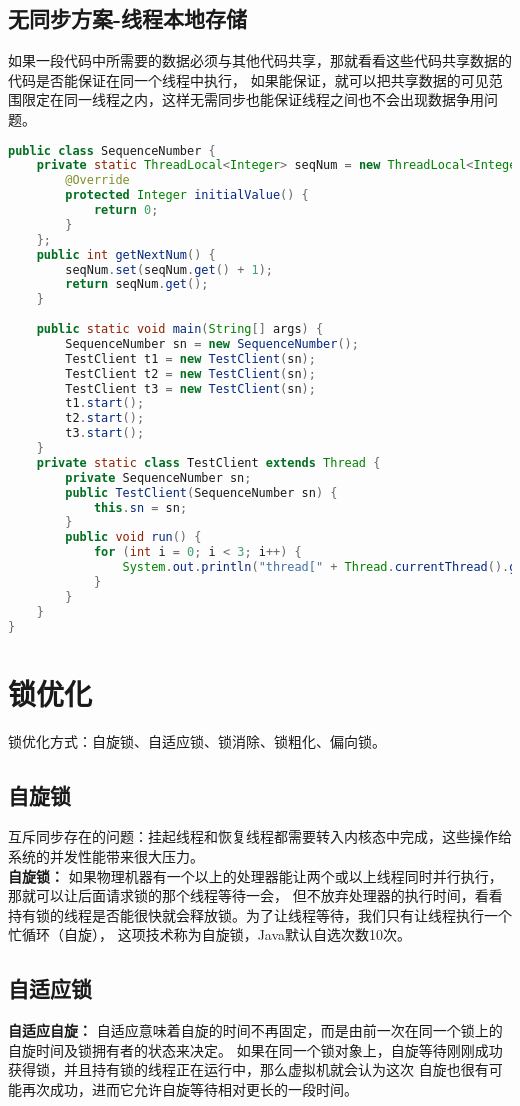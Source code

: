 \subsection{无同步方案-线程本地存储}
如果一段代码中所需要的数据必须与其他代码共享，那就看看这些代码共享数据的代码是否能保证在同一个线程中执行，
如果能保证，就可以把共享数据的可见范围限定在同一线程之内，这样无需同步也能保证线程之间也不会出现数据争用问题。
\begin{lstlisting}[language=java]
public class SequenceNumber {
	private static ThreadLocal<Integer> seqNum = new ThreadLocal<Integer>(){
		@Override
		protected Integer initialValue() {
			return 0;
		}
	};
	public int getNextNum() {
		seqNum.set(seqNum.get() + 1);
		return seqNum.get();
	}
	
	public static void main(String[] args) {
		SequenceNumber sn = new SequenceNumber();
		TestClient t1 = new TestClient(sn);
		TestClient t2 = new TestClient(sn);
		TestClient t3 = new TestClient(sn);
		t1.start();
		t2.start();
		t3.start();
	}
	private static class TestClient extends Thread {
		private SequenceNumber sn;
		public TestClient(SequenceNumber sn) {
			this.sn = sn;
		}
		public void run() {
			for (int i = 0; i < 3; i++) {
				System.out.println("thread[" + Thread.currentThread().getName() + "]sn[" + sn.getNextNum() + "]");
			}
		}
	}
}
\end{lstlisting}
\section{锁优化}
锁优化方式：自旋锁、自适应锁、锁消除、锁粗化、偏向锁。
\subsection{自旋锁}
\noindent 互斥同步存在的问题：挂起线程和恢复线程都需要转入内核态中完成，这些操作给系统的并发性能带来很大压力。
\\ \textbf{自旋锁：}
如果物理机器有一个以上的处理器能让两个或以上线程同时并行执行，那就可以让后面请求锁的那个线程等待一会，
但不放弃处理器的执行时间，看看持有锁的线程是否能很快就会释放锁。为了让线程等待，我们只有让线程执行一个忙循环（自旋），
这项技术称为自旋锁，Java默认自选次数10次。
\subsection{自适应锁}
\noindent \textbf{自适应自旋：}
自适应意味着自旋的时间不再固定，而是由前一次在同一个锁上的自旋时间及锁拥有者的状态来决定。
如果在同一个锁对象上，自旋等待刚刚成功获得锁，并且持有锁的线程正在运行中，那么虚拟机就会认为这次
自旋也很有可能再次成功，进而它允许自旋等待相对更长的一段时间。
